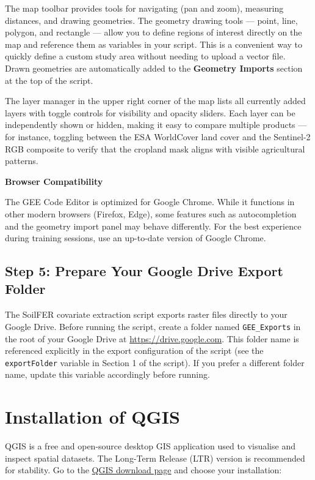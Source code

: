 \documentclass[
  10pt,
  b5paper,
  oneside]{book}
\begin{document}
The map toolbar provides tools for navigating (pan and zoom), measuring distances, and drawing geometries. The geometry drawing tools --- point, line, polygon, and rectangle --- allow you to define regions of interest directly on the map and reference them as variables in your script. This is a convenient way to quickly define a custom study area without needing to upload a vector file. Drawn geometries are automatically added to the \textbf{Geometry Imports} section at the top of the script.

The layer manager in the upper right corner of the map lists all currently added layers with toggle controls for visibility and opacity sliders. Each layer can be independently shown or hidden, making it easy to compare multiple products --- for instance, toggling between the ESA WorldCover land cover and the Sentinel-2 RGB composite to verify that the cropland mask aligns with visible agricultural patterns.

\textbf{Browser Compatibility}

The GEE Code Editor is optimized for Google Chrome. While it functions in other modern browsers (Firefox, Edge), some features such as autocompletion and the geometry import panel may behave differently. For the best experience during training sessions, use an up-to-date version of Google Chrome.

\subsection{Step 5: Prepare Your Google Drive Export Folder}\label{step-5-prepare-your-google-drive-export-folder}

The SoilFER covariate extraction script exports raster files directly to your Google Drive. Before running the script, create a folder named \texttt{GEE\_Exports} in the root of your Google Drive at \url{https://drive.google.com}. This folder name is referenced explicitly in the export configuration of the script (see the \texttt{exportFolder} variable in Section 1 of the script). If you prefer a different folder name, update this variable accordingly before running.

\section*{Installation of QGIS}\label{installation-of-qgis}

QGIS is a free and open-source desktop GIS application used to visualise and inspect spatial datasets. The Long-Term Release (LTR) version is recommended for stability.
Go to the \href{https://qgis.org/download/}{QGIS download page} and choose your installation:
\end{document}
